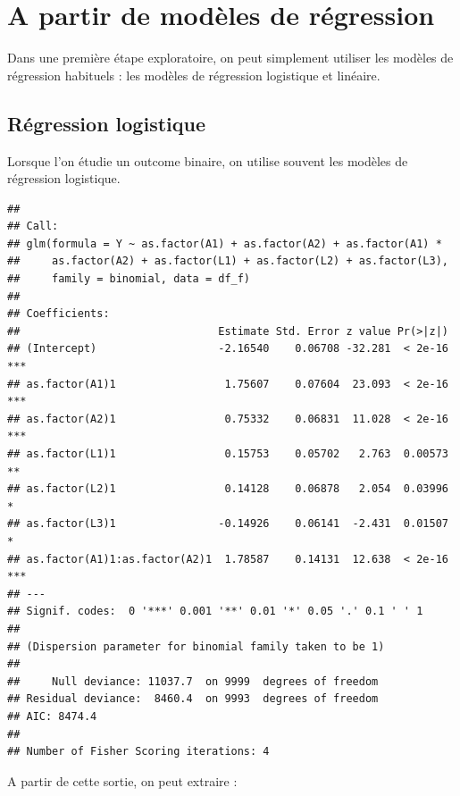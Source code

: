 \documentclass[
]{book}
\begin{document}
\hypertarget{regression}{%
\chapter{A partir de modèles de régression}\label{regression}}

Dans une première étape exploratoire, on peut simplement utiliser les modèles de régression habituels : les modèles de régression logistique et linéaire.

\hypertarget{ruxe9gression-logistique}{%
\section{Régression logistique}\label{ruxe9gression-logistique}}

Lorsque l'on étudie un outcome binaire, on utilise souvent les modèles de régression logistique.

\begin{verbatim}
## 
## Call:
## glm(formula = Y ~ as.factor(A1) + as.factor(A2) + as.factor(A1) * 
##     as.factor(A2) + as.factor(L1) + as.factor(L2) + as.factor(L3), 
##     family = binomial, data = df_f)
## 
## Coefficients:
##                               Estimate Std. Error z value Pr(>|z|)    
## (Intercept)                   -2.16540    0.06708 -32.281  < 2e-16 ***
## as.factor(A1)1                 1.75607    0.07604  23.093  < 2e-16 ***
## as.factor(A2)1                 0.75332    0.06831  11.028  < 2e-16 ***
## as.factor(L1)1                 0.15753    0.05702   2.763  0.00573 ** 
## as.factor(L2)1                 0.14128    0.06878   2.054  0.03996 *  
## as.factor(L3)1                -0.14926    0.06141  -2.431  0.01507 *  
## as.factor(A1)1:as.factor(A2)1  1.78587    0.14131  12.638  < 2e-16 ***
## ---
## Signif. codes:  0 '***' 0.001 '**' 0.01 '*' 0.05 '.' 0.1 ' ' 1
## 
## (Dispersion parameter for binomial family taken to be 1)
## 
##     Null deviance: 11037.7  on 9999  degrees of freedom
## Residual deviance:  8460.4  on 9993  degrees of freedom
## AIC: 8474.4
## 
## Number of Fisher Scoring iterations: 4
\end{verbatim}

A partir de cette sortie, on peut extraire :
\end{document}
